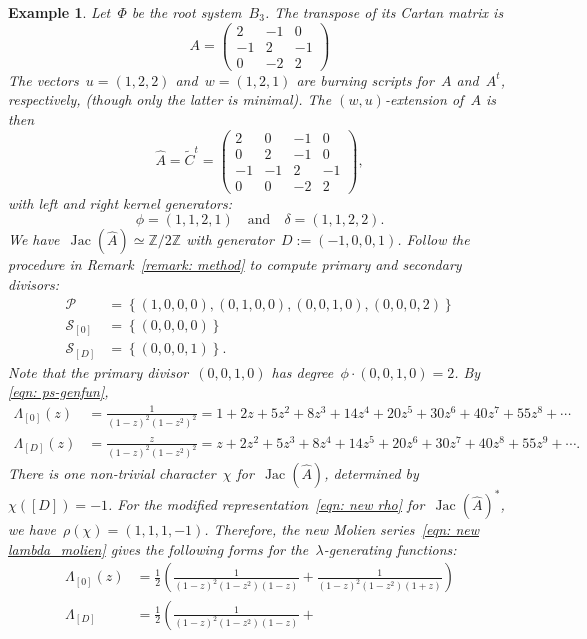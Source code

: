\documentclass{amsart}
\newtheorem{Example}[thm]{Example}
\newenvironment{example}
  {\begin{Example}\rm}{\end{Example}}
\DeclareMathOperator{\Jac}{Jac}
\newcommand{\primary}{\mathcal{P}}
\newcommand{\secondary}{\mathcal{S}}
\newcommand{\Z}{\mathbb{Z}}
\newcommand{\wA}{\widehat{A}}
\begin{document}
\begin{example}  Let~$\Phi$ be the root system~$B_3$.  The transpose of its
  Cartan matrix is
    \[
A =
\left(\begin{array}{rrr}
    2&-1&0\\
    -1&2&-1\\
    0&-2&2
\end{array} \right)
\]
The vectors~$u=(1,2,2)$ and~$w=(1,2,1)$ are burning scripts for~$A$ and~$A^t$,
respectively, (though only the latter is minimal).  The $(w,u)$-extension
of~$A$ is then
\[
\wA = \widetilde{C}^t=
\left(\begin{array}{rrrr}
    2&0&-1&0\\
    0&2&-1&0\\
    -1&-1&2&-1\\
    0&0&-2&2
\end{array} \right),
\]
with left and right kernel generators:
\[
  \phi = (1,1,2,1)\quad\text{and}\quad\delta = (1,1,2,2).
\]
We have~$\Jac(\wA)\simeq\Z/2\Z$ with generator~$D:=(-1,0,0,1)$.  Follow the
procedure in Remark~\ref{remark: method} to compute primary and secondary
divisors:
\begin{align*}
  \primary\ &=  \left\{ (1,0,0,0),(0,1,0,0),(0,0,1,0),(0,0,0,2) \right\}\\
  \secondary_{[0]}&= \left\{ (0,0,0,0) \right\}\\
  \secondary_{[D]}&= \left\{ (0,0,0,1) \right\}.
\end{align*}
Note that the primary divisor~$(0,0,1,0)$ has degree~$\phi\cdot(0,0,1,0)=2$. 
By \eqref{eqn: ps-genfun},
\begin{align*}
  \Lambda_{[0]}(z)&= \frac{1}{(1-z)^2(1-z^2)^2}=
  1 + 2z + 5z^2 + 8z^3 + 14z^4 + 20z^5 + 30z^6 + 40z^7 + 55z^8
  +\cdots\\[8pt]
  \Lambda_{[D]}(z)&= \frac{z}{(1-z)^2(1-z^2)^2}=
  z + 2z^2 + 5z^3 + 8z^4 + 14z^5 + 20z^6 + 30z^7 + 40z^8 + 55z^9 +
  \cdots.
\end{align*}
There is one non-trivial character~$\chi$ for~$\Jac(\wA)$, determined
by~$\chi([D])=-1$.  For the modified representation~\eqref{eqn: new rho}
for~$\Jac(\wA)^*$, we have~$\rho(\chi)=(1,1,1,-1)$.  Therefore, the new Molien
series~\eqref{eqn: new lambda_molien} gives the following forms for
the~$\lambda$-generating functions:
\begin{align*}
  \Lambda_{[0]}(z)&= \frac{1}{2}\left( \frac{1}{(1-z)^2(1-z^2)(1-z)}
+\frac{1}{(1-z)^2(1-z^2)(1+z)}
  \right)\\[8pt]
  \Lambda_{[D]}&= \frac{1}{2}\left( \frac{1}{(1-z)^2(1-z^2)(1-z)}+

\end{align*}
\end{example}
\end{document}
